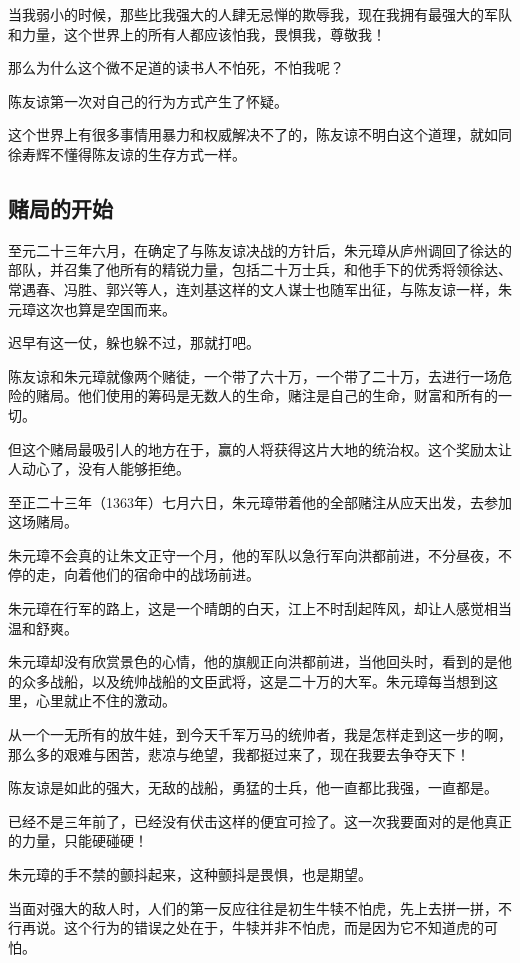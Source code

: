 \begin{multicols}{\theparacolNo}
		当我弱小的时候，那些比我强大的人肆无忌惮的欺辱我，现在我拥有最强大的军队和力量，这个世界上的所有人都应该怕我，畏惧我，尊敬我！

		那么为什么这个微不足道的读书人不怕死，不怕我呢？

		陈友谅第一次对自己的行为方式产生了怀疑。

		这个世界上有很多事情用暴力和权威解决不了的，陈友谅不明白这个道理，就如同徐寿辉不懂得陈友谅的生存方式一样。

		\subsection{赌局的开始}
		至元二十三年六月，在确定了与陈友谅决战的方针后，朱元璋从庐州调回了徐达的部队，并召集了他所有的精锐力量，包括二十万士兵，和他手下的优秀将领徐达、常遇春、冯胜、郭兴等人，连刘基这样的文人谋士也随军出征，与陈友谅一样，朱元璋这次也算是空国而来。

		迟早有这一仗，躲也躲不过，那就打吧。

		陈友谅和朱元璋就像两个赌徒，一个带了六十万，一个带了二十万，去进行一场危险的赌局。他们使用的筹码是无数人的生命，赌注是自己的生命，财富和所有的一切。

		但这个赌局最吸引人的地方在于，赢的人将获得这片大地的统治权。这个奖励太让人动心了，没有人能够拒绝。

		至正二十三年（1363年）七月六日，朱元璋带着他的全部赌注从应天出发，去参加这场赌局。

		朱元璋不会真的让朱文正守一个月，他的军队以急行军向洪都前进，不分昼夜，不停的走，向着他们的宿命中的战场前进。

		朱元璋在行军的路上，这是一个晴朗的白天，江上不时刮起阵风，却让人感觉相当温和舒爽。

		朱元璋却没有欣赏景色的心情，他的旗舰正向洪都前进，当他回头时，看到的是他的众多战船，以及统帅战船的文臣武将，这是二十万的大军。朱元璋每当想到这里，心里就止不住的激动。

		从一个一无所有的放牛娃，到今天千军万马的统帅者，我是怎样走到这一步的啊，那么多的艰难与困苦，悲凉与绝望，我都挺过来了，现在我要去争夺天下！

		陈友谅是如此的强大，无敌的战船，勇猛的士兵，他一直都比我强，一直都是。

		已经不是三年前了，已经没有伏击这样的便宜可捡了。这一次我要面对的是他真正的力量，只能硬碰硬！

		朱元璋的手不禁的颤抖起来，这种颤抖是畏惧，也是期望。

		当面对强大的敌人时，人们的第一反应往往是初生牛犊不怕虎，先上去拼一拼，不行再说。这个行为的错误之处在于，牛犊并非不怕虎，而是因为它不知道虎的可怕。


\end{multicols}
